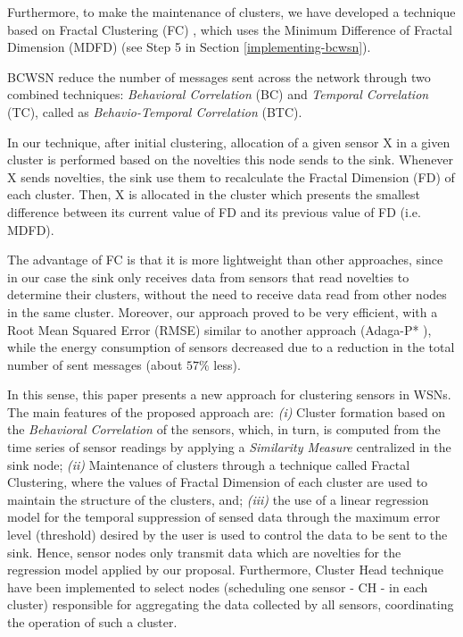 \documentclass{acm_proc_article-sp}
\begin{document}
Furthermore, to make the maintenance of clusters, we have developed a technique
based on Fractal Clustering (FC) \cite{Barbara1999}, which uses the Minimum
Difference of Fractal Dimension (MDFD) (see Step 5 in Section
\ref{implementing-bcwsn}).
\vspace*{-.3cm}

BCWSN reduce the number of messages sent across the network through two 
combined techniques: {\it Behavioral Correlation} (BC) and {\it Temporal 
Correlation} (TC), called as {\it Behavio-Temporal Correlation} (BTC).
\vspace*{-.3cm}

In our technique, after initial clustering, allocation of a given sensor 
X in a given cluster is performed based on the novelties this node sends 
to the sink. Whenever X sends novelties, the sink use them to recalculate 
the Fractal Dimension (FD) of each cluster.
Then, X is allocated in the cluster which presents the smallest difference
between its current value of FD and its previous value of FD (i.e. MDFD).
\vspace*{-.3cm}

The advantage of FC is that it is more lightweight than other approaches, since in 
our case the sink only receives data from sensors that read novelties to determine
their clusters, without the need to receive data read from other nodes in the same
cluster. Moreover, our approach proved to be very efficient, with a Root Mean 
Squared Error (RMSE) similar to another approach (Adaga-P* \cite{MaiaSAC2013,
MaiaACR2013}), while the energy consumption of sensors decreased due to a reduction
in the total number of sent messages (about $57\%$ less).
\vspace*{-.3cm}

In this sense, this paper presents a new approach for clustering sensors in
WSNs. The main features of the proposed approach are: {\it (i)} Cluster
formation based on the \textit{Behavioral Correlation} of the sensors, which, in
turn, is computed from the time series of sensor readings by applying a
\textit{Similarity Measure} centralized in the sink node; {\it (ii)} Maintenance
of clusters through a technique called Fractal Clustering, where the values of
Fractal Dimension of each cluster are used to maintain the structure of the
clusters, and; {\it (iii)} the use of a linear regression model for the temporal
suppression of sensed data through the maximum error level (threshold) desired
by the user is used to control the data to be sent to the sink. Hence, sensor
nodes only transmit data which are novelties for the regression model applied by
our proposal. Furthermore, Cluster Head technique have been implemented to
select nodes (scheduling one sensor - CH - in each cluster) responsible for
aggregating the data collected by all sensors, coordinating the operation of
such a cluster.
\vspace*{-.3cm}
\end{document}
